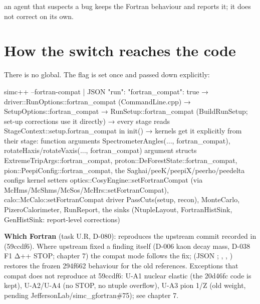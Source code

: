 \begin{simcnote}
an agent that suspects a bug keeps the Fortran behaviour and reports it; it does not correct on its own.
\end{simcnote}
\section{\texorpdfstring{How the switch reaches the code}{How the switch reaches the code}}\label{translation_report-05u5fcompat:52-how-the-switch-reaches-the-code}
There is no global. The flag is set once and passed down explicitly:

\begin{simcplain}[basicstyle=\ttfamily\tiny]
simc++ --fortran-compat  |  JSON "run": {"fortran_compat": true}
  → driver::RunOptions::fortran_compat                         (CommandLine.cpp)
  → SetupOptions::fortran_compat → RunSetup::fortran_compat    (BuildRunSetup; set-up corrections use it directly)
  → every stage reads StageContext::setup.fortran_compat in init()
  → kernels get it explicitly from their stage:
        function arguments            SpectrometerAngles(..., fortran_compat), rotateHaxis/rotateVaxis(..., fortran_compat)
        argument structs              ExtremeTripArgs::fortran_compat, proton::DeForestState::fortran_compat,
                                      pion::PeepiConfig::fortran_compat, the Saghai/peeK/peepiX/peerho/peedelta configs
        kernel setters                optics::CosyEngine::setFortranCompat (via McHms/McShms/McSos/McHrs::setFortranCompat),
                                      calo::McCalo::setFortranCompat
        driver                        PassCuts(setup, recon), MonteCarlo, PizeroCalorimeter, RunReport, the sinks
                                      (NtupleLayout, FortranHistSink, GenHistSink: report-level corrections)
\end{simcplain}
\textbf{Which Fortran} (task U.R, D-080):  reproduces the upstream commit recorded in 
(59ccdf6). Where upstream fixed a finding itself (D-006 kaon decay mass, D-038 F1 Δ++ STOP; chapter 7) the compat
mode follows the fix;  (JSON ; ,
, ) restores the frozen 294f662 behaviour for the old
references. Exceptions that compat does not reproduce at 59ccdf6: U-A1 nuclear elastic (the 20d46fc code is kept),
U-A2/U-A4 (no STOP, no ntuple overflow), U-A3 pion 1/Z (old weight, pending JeffersonLab/\allowbreak{}simc\_\allowbreak{}gfortran\#75); see
chapter 7.

